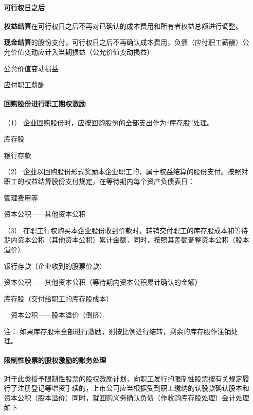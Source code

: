 \documentclass[UTF8,12pt]{ctexart}
\newenvironment{Dr}{%
	\begin{list}{}%
		{
			\setlength{\leftmargin}{2em}
			\setlength{\labelwidth}{2em}
			\setlength{\labelsep}{0pt}
			\setlength{\itemindent}{0pt}
			\setlength{\listparindent}{0pt}
			\setlength{\parsep}{0pt}
			\setlength{\topsep}{0pt}
		}
		\item[\textbf{借：}]
	}{%
	\end{list}
}
\newenvironment{Cr}{%
	\begin{list}{}%
		{
			\setlength{\leftmargin}{2em}
			\setlength{\labelwidth}{2em}
			\setlength{\labelsep}{0pt}
			\setlength{\itemindent}{0pt}
			\setlength{\listparindent}{0pt}
			\setlength{\parsep}{0pt}
			\setlength{\topsep}{0pt}
		}
		\item[\textbf{贷：}]
	}{%
	\end{list}
}
\numberwithin{equation}{section} %
\numberwithin{figure}{section}
\numberwithin{table}{section}
\begin{document}
	\paragraph{可行权日之后}
	\textbf{权益结算}在可行权日之后不再对已确认的成本费用和所有者权益总额进行调整。
	
	\textbf{现金结算}的股份支付，可行权日之后不再确认成本费用，负债（应付职工薪酬）公允价值变动应计入当期损益（公允价值变动损益）

	\begin{Dr}
		公允价值变动损益
	\end{Dr}	
	\begin{Cr}
		应付职工薪酬
	\end{Cr}

	
	\paragraph{回购股份进行职工期权激励}
	（1）	企业回购股份时，应按回购股份的全部支出作为“库存股”处理。
	
	\begin{Dr}
		库存股
	\end{Dr}
	\begin{Cr}
		银行存款
	\end{Cr}

	（2）	企业以回购股份形式奖励本企业职工的，属于权益结算的股份支付。按照对职工的权益结算股份支付规定，在等待期内每个资产负债表日：
	
	\begin{Dr}
		管理费用等
	\end{Dr}
	\begin{Cr}
		资本公积——其他资本公积
	\end{Cr}

	（3）	在职工行权购买本企业股份收到价款时，转销交付职工的库存股成本和等待期内资本公积（其他资本公积）累计金额，同时，按照其差额调整资本公积（股本溢价）
	
	\begin{Dr}
		银行存款（企业收到的股票价款）
		
		资本公积——其他资本公积（等待期内资本公积累计确认的金额）
	\end{Dr}
	\begin{Cr}
		库存股（交付给职工的库存股成本） 
		
		\ \ 资本公积——股本溢价（倒挤）
	\end{Cr}

	注：
	如果库存股未全部进行激励，则按比例进行结转，剩余的库存股作注销处理。
	
	\paragraph{限制性股票的股权激励的账务处理}
	对于此类授予限制性股票的股权激励计划，向职工发行的限制性股票按有关规定履行了注册登记等增资手续的，上市公司应当根据受到职工缴纳的认股款确认股本和资本公积（股本溢价）同时，就回购义务确认负债（作收购库存股处理）会计处理如下
	
\end{document}
